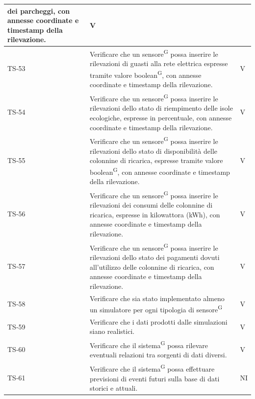 \documentclass[8pt]{article}
\newcommand{\glossterm}[1]{#1\textsuperscript{G}} %
\begin{document}
\begin{longtable}{|>{\centering}p{2cm}|>{\RaggedRight}m{12cm}|>{\centering\arraybackslash}p{2cm}|}
    dei parcheggi, con annesse coordinate e timestamp della rilevazione. & V \\
    \hline
    TS-53 & Verificare che un \glossterm{sensore} possa inserire le rilevazioni di guasti alla rete elettrica espresse tramite valore \glossterm{boolean}, con annesse coordinate e timestamp della rilevazione. & V \\
    \hline
    TS-54 & Verificare che un \glossterm{sensore} possa inserire le rilevazioni dello stato di riempimento delle isole ecologiche,
    espresse in percentuale, con annesse coordinate e timestamp della rilevazione. & V \\
    \hline
    TS-55 & Verificare che un \glossterm{sensore} possa inserire le rilevazioni dello stato di disponibilità delle colonnine di ricarica,
    espresse tramite valore \glossterm{boolean}, con annesse coordinate e timestamp della rilevazione. & V \\
    \hline
    TS-56 & Verificare che un \glossterm{sensore} possa inserire le rilevazioni dei consumi delle colonnine di ricarica,
    espresse in kilowattora (kWh), con annesse coordinate e timestamp della rilevazione. & V \\
    \hline
    TS-57 & Verificare che un \glossterm{sensore} possa inserire le rilevazioni dello stato dei pagamenti dovuti all'utilizzo delle colonnine di ricarica, con annesse coordinate e timestamp della rilevazione. & V \\
    \hline
    TS-58 & Verificare che sia stato implementato almeno un simulatore per ogni tipologia di \glossterm{sensore}
    & V \\
    \hline
    TS-59 & Verificare che i dati prodotti dalle simulazioni siano realistici. & V \\
    \hline
    TS-60 & Verificare che il \glossterm{sistema} possa rilevare eventuali relazioni tra sorgenti di dati
    diversi. & V \\
    \hline
    TS-61 & Verificare che il \glossterm{sistema} possa effettuare previsioni di eventi futuri sulla base di dati storici e attuali. & NI \\
    \hline
\end{longtable}
\clearpage
\end{document}
